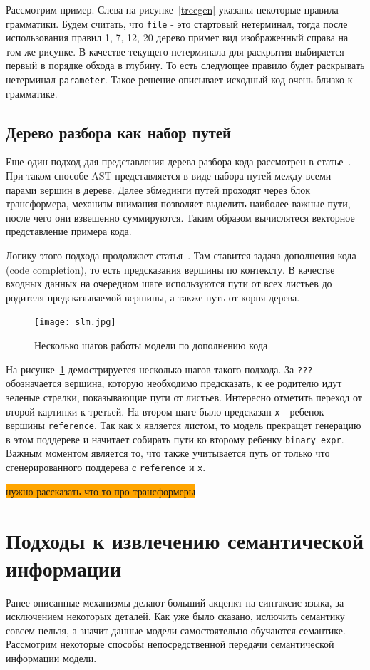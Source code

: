 \documentclass[times,specification,annotation]{itmo-student-thesis}
\begin{document}
Рассмотрим пример. Слева на рисунке~\ref{treegen} указаны некоторые правила грамматики. Будем считать, что \texttt{file} - это стартовый нетерминал, тогда после использования правил 1, 7, 12, 20 дерево примет вид изображенный справа на том же рисунке. В качестве текущего нетерминала для раскрытия выбирается первый в порядке обхода в глубину. То есть следующее правило будет раскрывать нетерминал \texttt{parameter}. Такое решение описывает исходный код очень близко к грамматике.

\subsection{Дерево разбора как набор путей}\label{sec:slm}
Еще один подход для представления дерева разбора кода рассмотрен в статье~\cite{code2vec}. При таком способе AST представляется в виде набора путей между всеми парами вершин в дереве. Далее эбмединги путей проходят через блок трансформера, механизм внимания позволяет выделить наиболее важные пути, после чего они взвешенно суммируются. Таким образом вычислятеся векторное представление примера кода.

Логику этого подхода продолжает статья~\cite{slm}. Там ставится задача дополнения кода (code completion), то есть предсказания вершины по контексту. В качестве входных данных на очередном шаге используются пути от всех листьев до родителя предсказываемой вершины, а также путь от корня дерева.

\begin{figure}[!h]
    \caption{Несколько шагов работы модели по дополнению кода}\label{slm}
    \centering
    \texttt{[image: slm.jpg]}
\end{figure}

На рисунке~\ref{slm} демострируется несколько шагов такого подхода. За \texttt{???} обозначается вершина, которую необходимо предсказать, к ее родителю идут зеленые стрелки, показывающие пути от листьев. Интересно отметить переход от второй картинки к третьей. На втором шаге было предсказан \texttt{x} - ребенок вершины \texttt{reference}. Так как \texttt{x} является листом, то модель прекращет генерацию в этом поддереве и начитает собирать пути ко второму ребенку \texttt{binary expr}. Важным моментом является то, что также учитывается путь от только что сгенерированного поддерева с \texttt{reference} и \texttt{x}.

\colorbox{orange}{нужно рассказать что-то про трансформеры}

\section{Подходы к извлечению семантической информации}\label{sec:semantic}
Ранее описанные механизмы делают больший акценкт на синтаксис языка, за исключением некоторых деталей. Как уже было сказано, ислючить семантику совсем нельзя, а значит данные модели самостоятельно обучаются семантике. Рассмотрим некоторые способы непосредственной передачи семантической информации модели.
\end{document}
